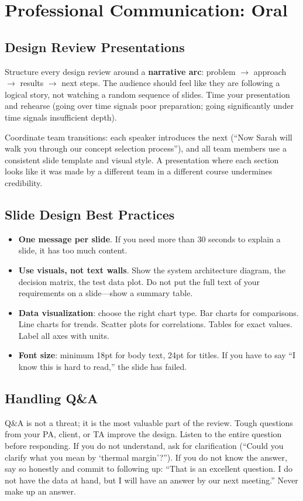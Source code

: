 \chapter{Professional Communication: Oral}

\section{Design Review Presentations}
Structure every design review around a \textbf{narrative arc}: problem $\to$ approach $\to$ results $\to$ next steps. The audience should feel like they are following a logical story, not watching a random sequence of slides. Time your presentation and rehearse (going over time signals poor preparation; going significantly under time signals insufficient depth).

Coordinate team transitions: each speaker introduces the next (``Now Sarah will walk you through our concept selection process''), and all team members use a consistent slide template and visual style. A presentation where each section looks like it was made by a different team in a different course undermines credibility.

\section{Slide Design Best Practices}
\begin{itemize}[nosep,leftmargin=1.5em]
\item \textbf{One message per slide}. If you need more than 30 seconds to explain a slide, it has too much content.
\item \textbf{Use visuals, not text walls}. Show the system architecture diagram, the decision matrix, the test data plot. Do not put the full text of your requirements on a slide---show a summary table.
\item \textbf{Data visualization}: choose the right chart type. Bar charts for comparisons. Line charts for trends. Scatter plots for correlations. Tables for exact values. Label all axes with units.
\item \textbf{Font size}: minimum 18pt for body text, 24pt for titles. If you have to say ``I know this is hard to read,'' the slide has failed.
\end{itemize}

\section{Handling Q\&A}
Q\&A is not a threat; it is the most valuable part of the review. Tough questions from your PA, client, or TA improve the design. Listen to the entire question before responding. If you do not understand, ask for clarification (``Could you clarify what you mean by `thermal margin'?''). If you do not know the answer, say so honestly and commit to following up: ``That is an excellent question. I do not have the data at hand, but I will have an answer by our next meeting.'' Never make up an answer.

